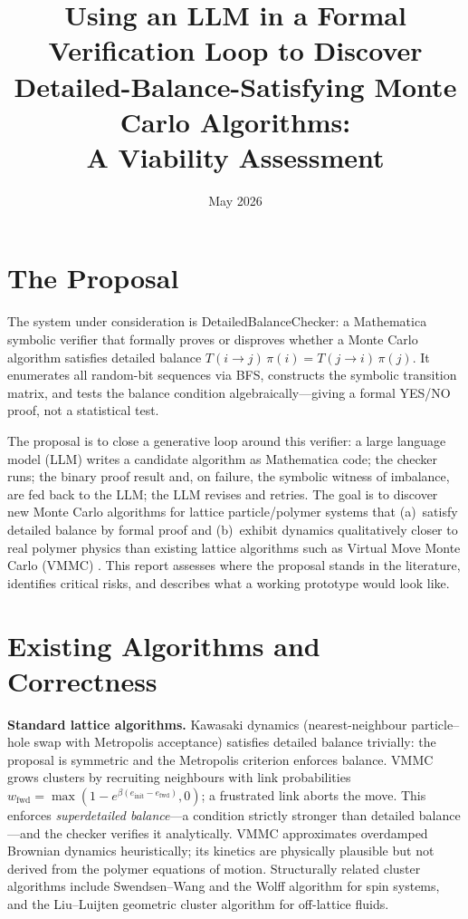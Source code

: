 \documentclass[10.5pt]{article}
\title{\textbf{Using an LLM in a Formal Verification Loop to Discover\\[4pt]
Detailed-Balance-Satisfying Monte Carlo Algorithms:\\[4pt]
A Viability Assessment}}
\author{}
\date{May 2026}
\begin{document}
\maketitle
\vspace{-0.8em}

\section{The Proposal}

The system under consideration is DetailedBalanceChecker: a Mathematica symbolic
verifier that formally proves or disproves whether a Monte Carlo algorithm satisfies
detailed balance $T(i \to j)\,\pi(i) = T(j \to i)\,\pi(j)$.  It enumerates all
random-bit sequences via BFS, constructs the symbolic transition matrix, and tests
the balance condition algebraically---giving a formal YES/NO proof, not a
statistical test.

The proposal is to close a generative loop around this verifier: a large
language model (LLM) writes a candidate algorithm as Mathematica code; the
checker runs; the binary proof result and, on failure, the symbolic witness of
imbalance, are fed back to the LLM; the LLM revises and retries.  The goal is to
discover new Monte Carlo algorithms for lattice particle/polymer systems that
(a)~satisfy detailed balance by formal proof and (b)~exhibit dynamics
qualitatively closer to real polymer physics than existing lattice algorithms such
as Virtual Move Monte Carlo (VMMC) \cite{whitelam2007}.  This report assesses
where the proposal stands in the literature, identifies critical risks, and
describes what a working prototype would look like.

\section{Existing Algorithms and Correctness}

\textbf{Standard lattice algorithms.}  Kawasaki dynamics \cite{kawasaki1966}
(nearest-neighbour particle--hole swap with Metropolis acceptance) satisfies
detailed balance trivially: the proposal is symmetric and the Metropolis criterion
enforces balance.  VMMC \cite{whitelam2007} grows clusters by recruiting
neighbours with link probabilities
$w_\text{fwd} = \max(1 - e^{\beta(e_\text{init} - e_\text{fwd})}, 0)$; a
frustrated link aborts the move.  This enforces \emph{superdetailed balance}---a
condition strictly stronger than detailed balance---and the checker verifies it
analytically.  VMMC approximates overdamped Brownian dynamics heuristically;
its kinetics are physically plausible but not derived from the polymer equations
of motion.  Structurally related cluster algorithms include Swendsen--Wang
\cite{sw1987} and the Wolff algorithm \cite{wolff1989} for spin systems, and the
Liu--Luijten geometric cluster algorithm \cite{liu2004} for off-lattice fluids.
\end{document}
